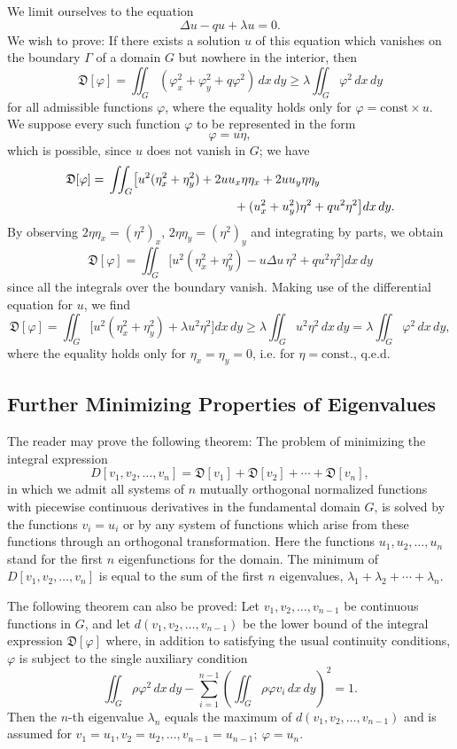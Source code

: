 We limit ourselves to the equation
\[
\Delta u-qu+\lambda u=0.
\]
We wish to prove: If there exists a solution $u$ of this equation which vanishes on the boundary $\Gamma$ of a domain $G$ but nowhere in the interior, then
\[
\mathfrak D[\varphi]=\iint_G(\varphi_x^2+\varphi_y^2+q\varphi^2)\,dx\,dy
\ge\lambda\iint_G\varphi^2\,dx\,dy
\]
for all admissible functions $\varphi$, where the equality holds only for $\varphi=\text{const}\times u$. We suppose every such function $\varphi$ to be represented in the form
\[
\varphi=u\eta,
\]
which is possible, since $u$ does not vanish in $G$; we have
\begin{align*}
\mathfrak D[\varphi]
={}&\iint_G\bigl[u^2(\eta_x^2+\eta_y^2)+2uu_x\eta\eta_x+2uu_y\eta\eta_y\\
&\hspace{36mm}+(u_x^2+u_y^2)\eta^2+qu^2\eta^2\bigr]dx\,dy.
\end{align*}
By observing $2\eta\eta_x=(\eta^2)_x$, $2\eta\eta_y=(\eta^2)_y$ and integrating by parts, we obtain
\[
\mathfrak D[\varphi]=\iint_G\bigl[u^2(\eta_x^2+\eta_y^2)-u\Delta u\,\eta^2+qu^2\eta^2\bigr]dx\,dy
\]
since all the integrals over the boundary vanish. Making use of the differential equation for $u$, we find
\[
\mathfrak D[\varphi]=\iint_G\bigl[u^2(\eta_x^2+\eta_y^2)+\lambda u^2\eta^2\bigr]dx\,dy
\ge\lambda\iint_Gu^2\eta^2\,dx\,dy
=\lambda\iint_G\varphi^2\,dx\,dy,
\]
where the equality holds only for $\eta_x=\eta_y=0$, i.e. for $\eta=\text{const.}$, q.e.d.

\subsection{Further Minimizing Properties of Eigenvalues}
The reader may prove the following theorem: The problem of minimizing the integral expression
\[
D[v_1,v_2,\ldots,v_n]
=\mathfrak D[v_1]+\mathfrak D[v_2]+\cdots+\mathfrak D[v_n],
\]
in which we admit all systems of $n$ mutually orthogonal normalized functions with piecewise continuous derivatives in the fundamental domain $G$, is solved by the functions $v_i=u_i$ or by any system of functions which arise from these functions through an orthogonal transformation. Here the functions $u_1,u_2,\ldots,u_n$ stand for the first $n$ eigenfunctions for the domain. The minimum of $D[v_1,v_2,\ldots,v_n]$ is equal to the sum of the first $n$ eigenvalues, $\lambda_1+\lambda_2+\cdots+\lambda_n$.

The following theorem can also be proved: Let $v_1,v_2,\ldots,v_{n-1}$ be continuous functions in $G$, and let $d(v_1,v_2,\ldots,v_{n-1})$ be the lower bound of the integral expression $\mathfrak D[\varphi]$ where, in addition to satisfying the usual continuity conditions, $\varphi$ is subject to the single auxiliary condition
\[
\iint_G\rho\varphi^2\,dx\,dy
-\sum_{i=1}^{n-1}\left(\iint_G\rho\varphi v_i\,dx\,dy\right)^2=1.
\]
Then the $n$-th eigenvalue $\lambda_n$ equals the maximum of $d(v_1,v_2,\ldots,v_{n-1})$ and is assumed for $v_1=u_1,v_2=u_2,\ldots,v_{n-1}=u_{n-1};\ \varphi=u_n$.

